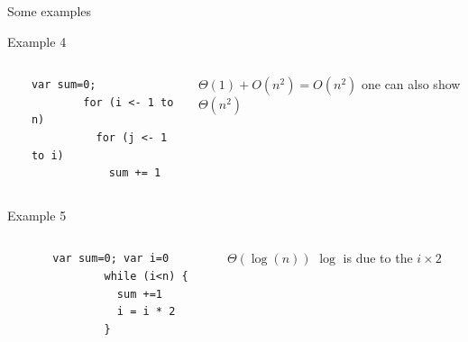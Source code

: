 \begin{frame}[fragile]{Some examples}
  \begin{block}{Example 4}\vspace{-\baselineskip}
    \begin{columns}
      \begin{column}{.1\linewidth}~\end{column}
      \begin{column}{.3\linewidth}
        \begin{Verbatim}[gobble=8]
        var sum=0;
        for (i <- 1 to n)
          for (j <- 1 to i)
            sum += 1
      \end{Verbatim}
      \end{column}
      \begin{column}{.3\linewidth}
        $\Theta(1)+O(n^2)=O(n^2)$
        one can also show $\Theta(n^2)$
      \end{column}
    \end{columns}
  \end{block}

  \begin{block}{Example 5}\vspace{-\baselineskip}
    \begin{columns}
      \begin{column}{.1\linewidth}~\end{column}
      \begin{column}{.3\linewidth}
        \begin{Verbatim}[gobble=8]
        var sum=0; var i=0
        while (i<n) {
          sum +=1
          i = i * 2
        }
      \end{Verbatim}
      \end{column}
      \begin{column}{.3\linewidth}
        $\Theta(\log(n))$
        $\log$ is due to the $i\times2$
      \end{column}
    \end{columns}
  \end{block}
\end{frame}
